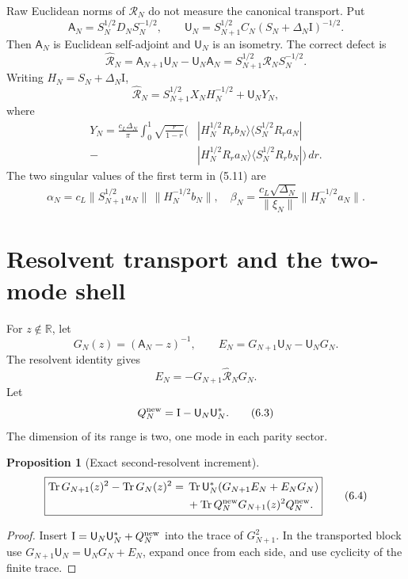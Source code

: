 \documentclass[11pt]{amsart}
\newtheorem{proposition}[theorem]{Proposition}
\theoremstyle{definition}
\theoremstyle{remark}
\newcommand{\R}{\mathbb R}
\newcommand{\Tr}{\operatorname{Tr}}
\newcommand{\id}{\mathrm I}
\newcommand{\dd}{\,d}
\begin{document}
Raw Euclidean norms of \(\mathcal R_N\) do not measure the canonical
transport.  Put
\[
 \mathsf A_N=S_N^{1/2}D_NS_N^{-1/2},\qquad
 \mathsf U_N=S_{N+1}^{1/2}C_N(S_N+\Delta_N\id)^{-1/2}.
\tag{5.9}
\]
Then \(\mathsf A_N\) is Euclidean self-adjoint and \(\mathsf U_N\) is an
isometry.  The correct defect is
\[
 \widehat{\mathcal R}_N
 =\mathsf A_{N+1}\mathsf U_N-\mathsf U_N\mathsf A_N
 =S_{N+1}^{1/2}\mathcal R_NS_N^{-1/2}.
\tag{5.10}
\]
Writing \(H_N=S_N+\Delta_N\id\),
\[
\boxed{
 \widehat{\mathcal R}_N
 =S_{N+1}^{1/2}X_NH_N^{-1/2}+\mathsf U_NY_N,}
\tag{5.11}
\]
where
\[
\begin{aligned}
Y_N=\frac{c_L\Delta_N}{\pi}\int_0^1\sqrt{\frac r{1-r}}
\bigl(&|H_N^{1/2}R_rb_N\rangle\langle S_N^{1/2}R_ra_N|\\
      -&|H_N^{1/2}R_ra_N\rangle\langle S_N^{1/2}R_rb_N|\bigr)\dd r.
\end{aligned}
\tag{5.12}
\]
The two singular values of the first term in (5.11) are
\[
 \alpha_N=c_L\|S_{N+1}^{1/2}u_N\|\,\|H_N^{-1/2}b_N\|,
\quad
 \beta_N=\frac{c_L\sqrt{\Delta_N}}{\|\xi_N\|}
          \|H_N^{-1/2}a_N\|.
\tag{5.13}
\]

\section{Resolvent transport and the two-mode shell}
\label{sec:resolvent}

For \(z\notin\R\), let
\[
 G_N(z)=(\mathsf A_N-z)^{-1},\qquad
 E_N=G_{N+1}\mathsf U_N-\mathsf U_NG_N.
\tag{6.1}
\]
The resolvent identity gives
\[
\boxed{E_N=-G_{N+1}\widehat{\mathcal R}_NG_N.}
\tag{6.2}
\]
Let
\[
 Q_N^{\rm new}=\id-\mathsf U_N\mathsf U_N^*.
\tag{6.3}
\]
The dimension of its range is two, one mode in each parity sector.

\begin{proposition}[Exact second-resolvent increment]
\[
\boxed{
\begin{aligned}
\Tr G_{N+1}(z)^2-\Tr G_N(z)^2
={}&\Tr\mathsf U_N^*(G_{N+1}E_N+E_NG_N)\\
 &+\Tr Q_N^{\rm new}G_{N+1}(z)^2Q_N^{\rm new}.
\end{aligned}}
\tag{6.4}
\]
\end{proposition}

\begin{proof}
Insert \(\id=\mathsf U_N\mathsf U_N^*+Q_N^{\rm new}\) into the trace of
\(G_{N+1}^2\).  In the transported block use
\(G_{N+1}\mathsf U_N=\mathsf U_NG_N+E_N\), expand once from each side, and
use cyclicity of the finite trace.
\end{proof}
\end{document}
